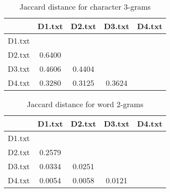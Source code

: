 \documentclass[11pt]{article}
\begin{document}
\begin{table}[!ht]  
  \centering
  \caption{Jaccard distance for character $3$-grams}
  \begin{tabular}{|c|c|c|c|c|}
    \cline{2-5}
    \multicolumn{1}{c|}{} & D1.txt & D2.txt & D3.txt & D4.txt\\ \hline
    D1.txt &    &    &   & \\ \hline
    D2.txt & 0.6400   &    &   & \\ \hline
    D3.txt &  0.4606  &  0.4404  &   & \\ \hline
    D4.txt & 0.3280  & 0.3125  & 0.3624 & \\ \hline
  \end{tabular}
  \end{table}
  
\begin{table}[!ht]  
  \centering
  \caption{Jaccard distance for word $2$-grams}
  \begin{tabular}{|c|c|c|c|c|}
    \cline{2-5}
    \multicolumn{1}{c|}{} & D1.txt & D2.txt & D3.txt & D4.txt\\ \hline
    D1.txt &    &    &   & \\ \hline
    D2.txt &  0.2579  &    &   & \\ \hline
    D3.txt &  0.0334  & 0.0251   &   & \\ \hline
    D4.txt &  0.0054 &  0.0058 & 0.0121 & \\ \hline
  \end{tabular}
  \end{table}
\end{document}
